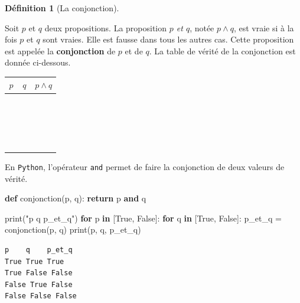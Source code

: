 \documentclass[
  letterpaper,
]{scrbook}
\newenvironment{Shaded}{}{}
\newcommand{\BuiltInTok}[1]{#1}
\newcommand{\ControlFlowTok}[1]{\textcolor[rgb]{0.00,0.44,0.13}{\textbf{#1}}}
\newcommand{\KeywordTok}[1]{\textcolor[rgb]{0.00,0.44,0.13}{\textbf{#1}}}
\newcommand{\NormalTok}[1]{#1}
\newcommand{\OperatorTok}[1]{\textcolor[rgb]{0.40,0.40,0.40}{#1}}
\newcommand{\StringTok}[1]{\textcolor[rgb]{0.25,0.44,0.63}{#1}}
\newcommand{\VariableTok}[1]{\textcolor[rgb]{0.10,0.09,0.49}{#1}}
\theoremstyle{plain}
\theoremstyle{definition}
\theoremstyle{definition}
\newtheorem{definition}{Définition}[chapter]
\theoremstyle{remark}
\begin{document}
\leavevmode{}%
\begin{definition}[La conjonction]\label{def-conjonction}

Soit \(p\) et \(q\) deux propositions. La proposition \emph{\(p\) et
\(q\)}, notée \(p\wedge q\), est vraie si à la fois \(p\) et \(q\) sont
vraies. Elle est fausse dans tous les autres cas. Cette proposition est
appelée la \textbf{conjonction} de \(p\) et de \(q\). La table de vérité
de la conjonction est donnée ci-dessous.

\begin{longtable}[]{@{}ccc@{}}
\toprule()
\(p\) & \(q\) & \(p \wedge q\) \\
\midrule()
\endhead
\(\phantom{V}\) & \(\phantom{V}\) & \(\phantom{V}\) \\
\(\phantom{V}\) & \(\phantom{V}\) & \(\phantom{V}\) \\
\(\phantom{V}\) & \(\phantom{V}\) & \(\phantom{V}\) \\
\(\phantom{V}\) & \(\phantom{V}\) & \(\phantom{V}\) \\
\bottomrule()
\end{longtable}

En \texttt{Python}, l'opérateur \texttt{and} permet de faire la
conjonction de deux valeurs de vérité.

\hypertarget{conjonction-python}{}
\begin{Shaded}
\begin{Highlighting}[]
\KeywordTok{def}\NormalTok{ conjonction(p, q):}
    \ControlFlowTok{return}\NormalTok{ p }\KeywordTok{and}\NormalTok{ q}

\BuiltInTok{print}\NormalTok{(}\StringTok{"p    q    p\_et\_q"}\NormalTok{)}
\ControlFlowTok{for}\NormalTok{ p }\KeywordTok{in}\NormalTok{ [}\VariableTok{True}\NormalTok{, }\VariableTok{False}\NormalTok{]:}
    \ControlFlowTok{for}\NormalTok{ q }\KeywordTok{in}\NormalTok{ [}\VariableTok{True}\NormalTok{, }\VariableTok{False}\NormalTok{]:}
\NormalTok{        p\_et\_q }\OperatorTok{=}\NormalTok{ conjonction(p, q)}
        \BuiltInTok{print}\NormalTok{(p, q, p\_et\_q)}
\end{Highlighting}
\end{Shaded}

\begin{verbatim}
p    q    p_et_q
True True True
True False False
False True False
False False False
\end{verbatim}

\end{definition}
\end{document}
